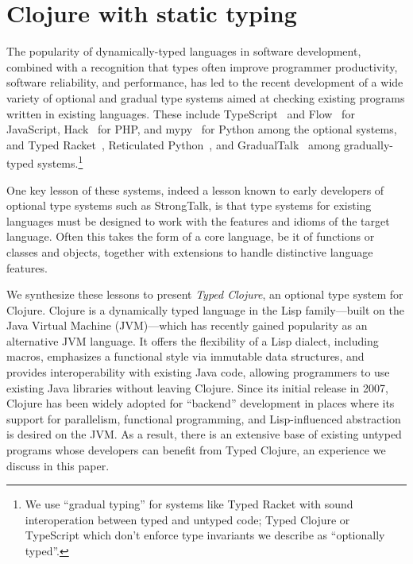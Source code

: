 \section{Clojure with static typing}


The popularity of dynamically-typed languages in software
development, combined with a recognition that types often improve
programmer productivity, software reliability, and performance, has
led to the recent development of a wide variety of optional and
gradual type systems aimed at checking existing programs written in
existing languages.  These include  TypeScript~\cite{typescript} and Flow~\cite{flow} for
JavaScript, Hack~\cite{hack} for PHP, and mypy~\cite{mypy}
for Python among the optional systems, and Typed Racket~\cite{TF08}, Reticulated
Python~\cite{Vitousek14}, and GradualTalk~\cite{gradualtalk} among gradually-typed systems.\footnote{We
  use ``gradual typing'' for systems like Typed Racket with sound
  interoperation between typed and untyped code; Typed Clojure or
 TypeScript which don't
  enforce type invariants we describe as ``optionally typed''.}

One key lesson of these systems, indeed a lesson known to early
developers of optional type systems such as StrongTalk, is that type
systems for existing languages must be designed to work with the
features and idioms of the target language. Often this takes the form
of a core language, be it of functions or classes and objects,
together with extensions to handle distinctive language features.


We synthesize these lessons to present \emph{Typed Clojure}, an
optional type system for Clojure. 
%
Clojure is a dynamically
typed language in the Lisp family---built on the Java Virtual
Machine (JVM)---which has recently gained popularity as an alternative
JVM language.  It offers the flexibility of a Lisp dialect, including
macros, emphasizes a functional style via
immutable data structures, and provides
interoperability with existing Java code, allowing programmers to use
existing Java libraries without leaving Clojure.
%
Since its initial release in 2007, Clojure has been widely adopted for
``backend'' development in places where its support for parallelism,
functional programming, and Lisp-influenced abstraction is desired on
the JVM. As a result, there is an extensive base of existing untyped
programs whose developers can benefit from Typed Clojure,
an experience we discuss in this paper.

